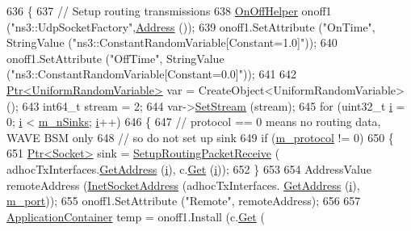 \begin{DoxyCode}
636 \{
637   \textcolor{comment}{// Setup routing transmissions}
638   \hyperlink{classns3_1_1OnOffHelper}{OnOffHelper} onoff1 (\textcolor{stringliteral}{"ns3::UdpSocketFactory"},\hyperlink{classns3_1_1Address}{Address} ());
639   onoff1.SetAttribute (\textcolor{stringliteral}{"OnTime"}, StringValue (\textcolor{stringliteral}{"ns3::ConstantRandomVariable[Constant=1.0]"}));
640   onoff1.SetAttribute (\textcolor{stringliteral}{"OffTime"}, StringValue (\textcolor{stringliteral}{"ns3::ConstantRandomVariable[Constant=0.0]"}));
641 
642   \hyperlink{classns3_1_1Ptr}{Ptr<UniformRandomVariable>} var = CreateObject<UniformRandomVariable> ();
643   int64\_t stream = 2;
644   var->\hyperlink{classns3_1_1RandomVariableStream_add11aaf975607746b7e271d300659a94}{SetStream} (stream);
645   \textcolor{keywordflow}{for} (uint32\_t \hyperlink{bernuolliDistribution_8m_a6f6ccfcf58b31cb6412107d9d5281426}{i} = 0; \hyperlink{bernuolliDistribution_8m_a6f6ccfcf58b31cb6412107d9d5281426}{i} < \hyperlink{classRoutingHelper_acdb8f3c9431dbb2e425f76de24a77ff3}{m\_nSinks}; \hyperlink{bernuolliDistribution_8m_a6f6ccfcf58b31cb6412107d9d5281426}{i}++)
646     \{
647       \textcolor{comment}{// protocol == 0 means no routing data, WAVE BSM only}
648       \textcolor{comment}{// so do not set up sink}
649       \textcolor{keywordflow}{if} (\hyperlink{classRoutingHelper_a14f730151136d699031105c1db7990b0}{m\_protocol} != 0)
650         \{
651           \hyperlink{classns3_1_1Ptr}{Ptr<Socket>} sink = \hyperlink{classRoutingHelper_a58fe834e212745d0f0dcb5909eb02dd8}{SetupRoutingPacketReceive} (
      adhocTxInterfaces.\hyperlink{classns3_1_1Ipv4InterfaceContainer_ae63208dcd222be986822937ee4aa828c}{GetAddress} (\hyperlink{bernuolliDistribution_8m_a6f6ccfcf58b31cb6412107d9d5281426}{i}), c.\hyperlink{classns3_1_1NodeContainer_a9ed96e2ecc22e0f5a3d4842eb9bf90bf}{Get} (\hyperlink{bernuolliDistribution_8m_a6f6ccfcf58b31cb6412107d9d5281426}{i}));
652         \}
653 
654       AddressValue remoteAddress (\hyperlink{classns3_1_1InetSocketAddress}{InetSocketAddress} (adhocTxInterfaces.
      \hyperlink{classns3_1_1Ipv4InterfaceContainer_ae63208dcd222be986822937ee4aa828c}{GetAddress} (\hyperlink{bernuolliDistribution_8m_a6f6ccfcf58b31cb6412107d9d5281426}{i}), \hyperlink{classRoutingHelper_a986af262ca1d13b9ee4c0628936454b6}{m\_port}));
655       onoff1.SetAttribute (\textcolor{stringliteral}{"Remote"}, remoteAddress);
656 
657       \hyperlink{classns3_1_1ApplicationContainer}{ApplicationContainer} temp = onoff1.Install (c.\hyperlink{classns3_1_1NodeContainer_a9ed96e2ecc22e0f5a3d4842eb9bf90bf}{Get} (

\end{DoxyCode}
